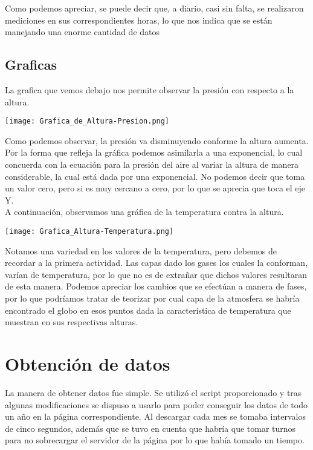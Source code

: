 \documentclass[a4paper,12pt]{article}
\begin{document}
\noindent
Como podemos apreciar, se puede decir que, a diario, casi sin falta, se realizaron mediciones en sus correspondientes horas, lo que nos indica que se están manejando una enorme cantidad de datos
\subsection{Graficas}
\noindent
La grafica que vemos debajo nos permite observar la presión con respecto a la altura.

\begin{center}
\texttt{[image: Grafica\_de\_Altura-Presion.png]}
\end{center}
\noindent
Como podemos observar, la presión va disminuyendo conforme la altura aumenta. Por la forma que refleja la gráfica podemos asimilarla a una exponencial, lo cual concuerda con la ecuación para la presión del aire al variar la altura de manera considerable, la cual está dada por una exponencial. No podemos decir que toma un valor cero, pero si es muy cercano a cero, por lo que se aprecia que toca el eje Y.\\

\noindent
A continuación, observamos una gráfica de la temperatura contra la altura.

\begin{center}
\texttt{[image: Grafica\_Altura-Temperatura.png]}
\end{center}

\noindent
Notamos una variedad en los valores de la temperatura, pero debemos de recordar a la primera actividad. Las capas dado los gases los cuales la conforman, varían de temperatura, por lo que no es de extrañar que dichos valores resultaran de esta manera. Podemos apreciar los cambios que se efectúan a manera de fases, por lo que podríamos tratar de teorizar por cual capa de la atmosfera se habría encontrado el globo en esos puntos dada la característica de temperatura que muestran en sus respectivas alturas.
\newpage
\section{Obtención de datos}
\noindent
La manera de obtener datos fue simple. Se utilizó el script proporcionado y tras algunas modificaciones se dispuso a usarlo para poder conseguir los datos de todo un año en la página correspondiente. Al descargar cada mes se tomaba intervalos de cinco segundos, además que se tuvo en cuenta que habría que tomar turnos para no sobrecargar el servidor de la página por lo que había tomado un tiempo.
\end{document}

